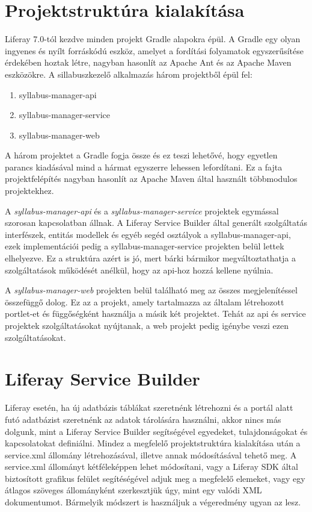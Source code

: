 \documentclass[hidelinks, 12pt, a4paper]{report}
\begin{document}
\section{Projektstruktúra kialakítása}

Liferay 7.0-tól kezdve minden projekt Gradle alapokra épül. A Gradle egy olyan ingyenes és nyílt forráskódú eszköz, amelyet a fordítási folyamatok egyszerűsítése érdekében hoztak létre, nagyban hasonlít az Apache Ant és az Apache Maven eszközökre. A sillabuszkezelő alkalmazás három projektből épül fel:
\begin{enumerate}
\item syllabus-manager-api
\item syllabus-manager-service
\item syllabus-manager-web
\end{enumerate}
A három projektet a Gradle fogja össze és ez teszi lehetővé, hogy egyetlen parancs kiadásával mind a hármat egyszerre lehessen lefordítani. Ez a fajta projektfelépítés nagyban hasonlít az Apache Maven által használt többmodulos projektekhez.

A \emph{syllabus-manager-api} és a \emph{syllabus-manager-service} projektek egymással szorosan kapcsolatban állnak. A Liferay Service Builder által generált szolgáltatás interfészek, entitás modellek és egyéb segéd osztályok a syllabus-manager-api, ezek implementációi pedig a syllabus-manager-service projekten belül lettek elhelyezve. Ez a struktúra azért is jó, mert bárki bármikor megváltoztathatja a szolgáltatások működését anélkül, hogy az api-hoz hozzá kellene nyúlnia.

A \emph{syllabus-manager-web} projekten belül található meg az összes megjelenítéssel összefüggő dolog. Ez az a projekt, amely tartalmazza az általam létrehozott portlet-et és függőségként használja a másik két projektet. Tehát az api és service projektek szolgáltatásokat nyújtanak, a web projekt pedig igénybe veszi ezen szolgáltatásokat.

\section{Liferay Service Builder}

Liferay esetén, ha új adatbázis táblákat szeretnénk létrehozni és a portál alatt futó adatbázist szeretnénk az adatok tárolására használni, akkor nincs más dolgunk, mint a Liferay Service Builder segítségével egyedeket, tulajdonságokat és kapcsolatokat definiálni. Mindez a megfelelő projektstruktúra kialakítása után a service.xml állomány létrehozásával, illetve annak módosításával tehető meg. A service.xml állományt kétféleképpen lehet módosítani, vagy a Liferay SDK által biztosított grafikus felület segítéségével adjuk meg a megfelelő elemeket, vagy egy átlagos szöveges állományként szerkesztjük úgy, mint egy valódi XML dokumentumot. Bármelyik módszert is használjuk a végeredmény ugyan az lesz.
\end{document}
